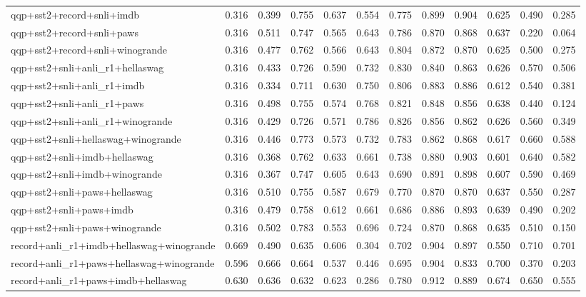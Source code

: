 \begin{table}[t]
\begin{tabular}{lrrrrrrrrrrr}
    qqp+sst2+record+snli+imdb & 0.316 & 0.399 & 0.755 & 0.637 & 0.554 & 0.775 & 0.899 & 0.904 & 0.625 & 0.490 & 0.285 \\
    qqp+sst2+record+snli+paws & 0.316 & 0.511 & 0.747 & 0.565 & 0.643 & 0.786 & 0.870 & 0.868 & 0.637 & 0.220 & 0.064 \\
    qqp+sst2+record+snli+winogrande & 0.316 & 0.477 & 0.762 & 0.566 & 0.643 & 0.804 & 0.872 & 0.870 & 0.625 & 0.500 & 0.275 \\
    qqp+sst2+snli+anli\_r1+hellaswag & 0.316 & 0.433 & 0.726 & 0.590 & 0.732 & 0.830 & 0.840 & 0.863 & 0.626 & 0.570 & 0.506 \\
    qqp+sst2+snli+anli\_r1+imdb & 0.316 & 0.334 & 0.711 & 0.630 & 0.750 & 0.806 & 0.883 & 0.886 & 0.612 & 0.540 & 0.381 \\
    qqp+sst2+snli+anli\_r1+paws & 0.316 & 0.498 & 0.755 & 0.574 & 0.768 & 0.821 & 0.848 & 0.856 & 0.638 & 0.440 & 0.124 \\
    qqp+sst2+snli+anli\_r1+winogrande & 0.316 & 0.429 & 0.726 & 0.571 & 0.786 & 0.826 & 0.856 & 0.862 & 0.626 & 0.560 & 0.349 \\
    qqp+sst2+snli+hellaswag+winogrande & 0.316 & 0.446 & 0.773 & 0.573 & 0.732 & 0.783 & 0.862 & 0.868 & 0.617 & 0.660 & 0.588 \\
    qqp+sst2+snli+imdb+hellaswag & 0.316 & 0.368 & 0.762 & 0.633 & 0.661 & 0.738 & 0.880 & 0.903 & 0.601 & 0.640 & 0.582 \\
    qqp+sst2+snli+imdb+winogrande & 0.316 & 0.367 & 0.747 & 0.605 & 0.643 & 0.690 & 0.891 & 0.898 & 0.607 & 0.590 & 0.469 \\
    qqp+sst2+snli+paws+hellaswag & 0.316 & 0.510 & 0.755 & 0.587 & 0.679 & 0.770 & 0.870 & 0.870 & 0.637 & 0.550 & 0.287 \\
    qqp+sst2+snli+paws+imdb & 0.316 & 0.479 & 0.758 & 0.612 & 0.661 & 0.686 & 0.886 & 0.893 & 0.639 & 0.490 & 0.202 \\
    qqp+sst2+snli+paws+winogrande & 0.316 & 0.502 & 0.783 & 0.553 & 0.696 & 0.724 & 0.870 & 0.868 & 0.635 & 0.510 & 0.150 \\
    record+anli\_r1+imdb+hellaswag+winogrande & 0.669 & 0.490 & 0.635 & 0.606 & 0.304 & 0.702 & 0.904 & 0.897 & 0.550 & 0.710 & 0.701 \\
    record+anli\_r1+paws+hellaswag+winogrande & 0.596 & 0.666 & 0.664 & 0.537 & 0.446 & 0.695 & 0.904 & 0.833 & 0.700 & 0.370 & 0.203 \\
    record+anli\_r1+paws+imdb+hellaswag & 0.630 & 0.636 & 0.632 & 0.623 & 0.286 & 0.780 & 0.912 & 0.889 & 0.674 & 0.650 & 0.555 \\

\end{tabular}
\end{table}
